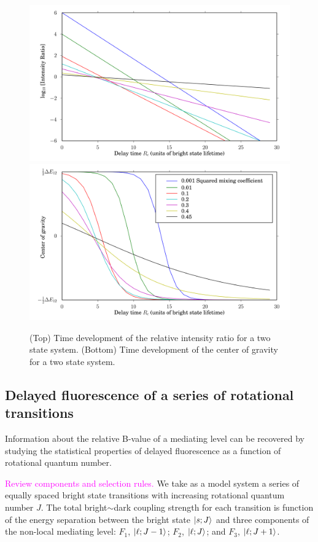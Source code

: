 \documentclass[12pt]{mitthesis}
\newcommand{\POINT}[1]{\textcolor{magenta}{#1}}
\begin{document}
\begin{figure}
  \caption{(Top) Time development of the relative intensity ratio for
    a two state system. (Bottom) Time development of the center of
    gravity for a two state system.}
  \label{fig:cog-devel}
  \centering
  \includegraphics[width=6in]{ratio-development.png}
  \includegraphics[width=6in]{cog-development.png}
\end{figure}

\subsection{Delayed fluorescence of a series of rotational
  transitions}

Information about the relative B-value of a mediating level can be
recovered by studying the statistical properties of delayed
fluorescence as a function of rotational quantum number.

\POINT{Review components and selection rules.}  We take as a model
system a series of equally spaced bright state transitions with
increasing rotational quantum number $J$.  The total bright$\sim$dark
coupling strength for each transition is function of the energy
separation between the bright state $\mathinner{|{s;J}\rangle}$ and three components
of the non-local mediating level: $F_1$, $\mathinner{|{\ell;J-1}\rangle}$; $F_2$,
$\mathinner{|{\ell;J}\rangle}$; and $F_3$, $\mathinner{|{\ell;J+1}\rangle}$.
\end{document}
